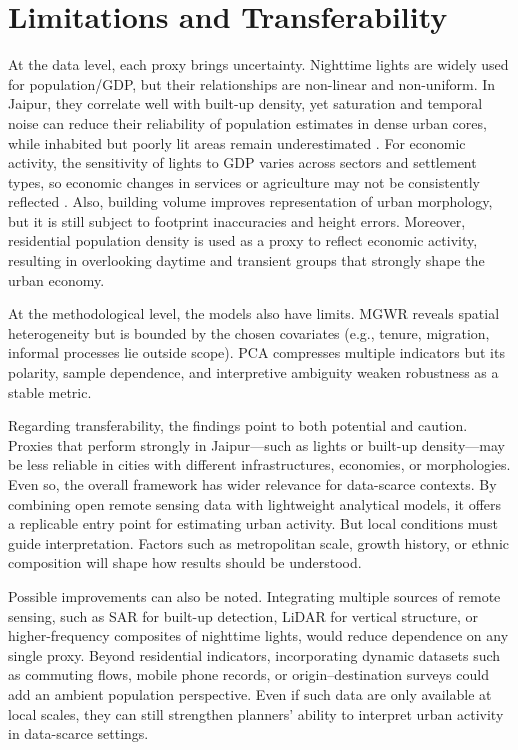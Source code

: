 \documentclass[
  12pt,
  oneside]{book}
\begin{document}
\section{Limitations and Transferability}\label{limitations-and-transferability}

At the data level, each proxy brings uncertainty. Nighttime lights are widely used for population/GDP, but their relationships are non-linear and non-uniform. In Jaipur, they correlate well with built-up density, yet saturation and temporal noise can reduce their reliability of population estimates in dense urban cores, while inhabited but poorly lit areas remain underestimated \autocite{wuBuildingVolumeAdjusted2023}. For economic activity, the sensitivity of lights to GDP varies across sectors and settlement types, so economic changes in services or agriculture may not be consistently reflected \autocite{bluhmWhatCanWe2022a}. Also, building volume improves representation of urban morphology, but it is still subject to footprint inaccuracies and height errors. Moreover, residential population density is used as a proxy to reflect economic activity, resulting in overlooking daytime and transient groups that strongly shape the urban economy.

At the methodological level, the models also have limits. MGWR reveals spatial heterogeneity but is bounded by the chosen covariates (e.g., tenure, migration, informal processes lie outside scope). PCA compresses multiple indicators but its polarity, sample dependence, and interpretive ambiguity weaken robustness as a stable metric.

Regarding transferability, the findings point to both potential and caution. Proxies that perform strongly in Jaipur---such as lights or built-up density---may be less reliable in cities with different infrastructures, economies, or morphologies. Even so, the overall framework has wider relevance for data-scarce contexts. By combining open remote sensing data with lightweight analytical models, it offers a replicable entry point for estimating urban activity. But local conditions must guide interpretation. Factors such as metropolitan scale, growth history, or ethnic composition will shape how results should be understood.

Possible improvements can also be noted. Integrating multiple sources of remote sensing, such as SAR for built-up detection, LiDAR for vertical structure, or higher-frequency composites of nighttime lights, would reduce dependence on any single proxy. Beyond residential indicators, incorporating dynamic datasets such as commuting flows, mobile phone records, or origin--destination surveys could add an ambient population perspective. Even if such data are only available at local scales, they can still strengthen planners' ability to interpret urban activity in data-scarce settings.
\end{document}
